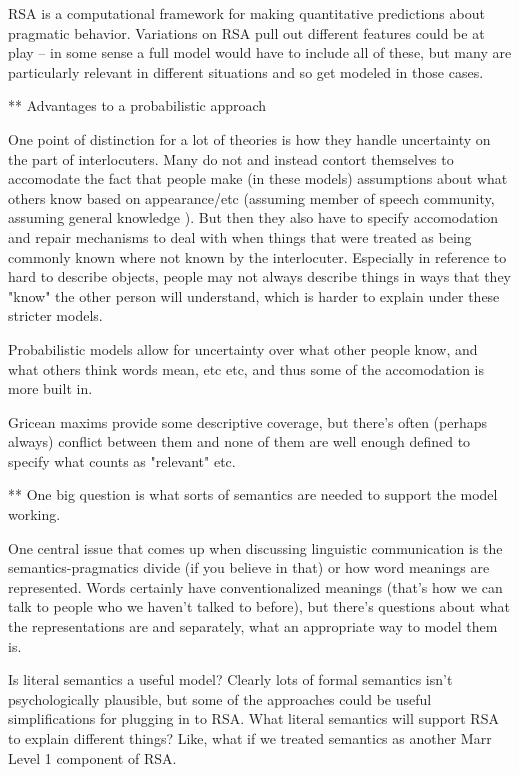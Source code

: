 \documentclass[]{article}
\begin{document}
\cite{goodman2016} RSA is a computational framework for making quantitative predictions about pragmatic behavior. Variations on RSA pull out different features could be at play -- in some sense a full model would have to include all of these, but many are particularly relevant in different situations and so get modeled in those cases. 

** Advantages to a probabilistic approach

One point of distinction for a lot of theories is how they handle uncertainty on the part of interlocuters. Many do not and instead contort themselves to accomodate the fact that people make (in these models) assumptions about what others know based on appearance/etc (assuming member of speech community, assuming general knowledge ). But then they also have to specify accomodation and repair mechanisms to deal with when things that were treated as being commonly known where not known by the interlocuter. Especially in reference to hard to describe objects, people may not always describe things in ways that they "know" the other person will understand, which is harder to explain under these stricter models. 

Probabilistic models allow for uncertainty over what other people know, and what others think words mean, etc etc, and thus some of the accomodation is more built in. 

Gricean maxims provide some descriptive coverage, but there's often (perhaps always) conflict between them and none of them are well enough defined to specify what counts as "relevant" etc. 

** One big question is what sorts of semantics are needed to support the model working. 

One central issue that comes up when discussing linguistic communication is the semantics-pragmatics divide (if you believe in that) or how word meanings are represented. Words certainly have conventionalized meanings (that's how we can talk to people who we haven't talked to before), but there's questions about what the representations are and separately, what an appropriate way to model them is. 

Is literal semantics a useful model? Clearly lots of formal semantics isn't psychologically plausible, but some of the approaches could be useful simplifications for plugging in to RSA. What literal semantics will support RSA to explain different things? Like, what if we treated semantics as another Marr Level 1 component of RSA. 
\end{document}
